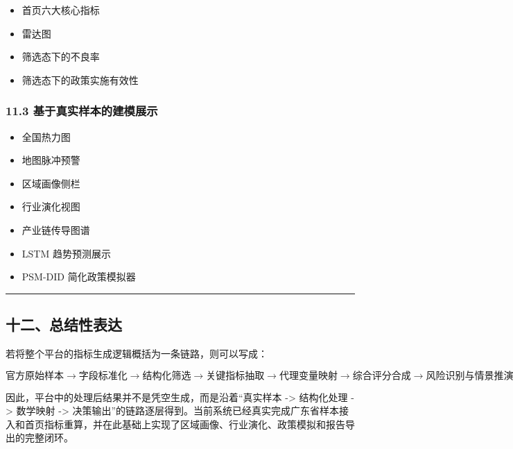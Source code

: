\documentclass[
]{article}
\providecommand{\tightlist}{%
  \setlength{\itemsep}{0pt}\setlength{\parskip}{0pt}}
\begin{document}
\begin{itemize}
\tightlist
\item
  首页六大核心指标
\item
  雷达图
\item
  筛选态下的不良率
\item
  筛选态下的政策实施有效性
\end{itemize}

\subsubsection{11.3
基于真实样本的建模展示}\label{ux57faux4e8eux771fux5b9eux6837ux672cux7684ux5efaux6a21ux5c55ux793a}

\begin{itemize}
\tightlist
\item
  全国热力图
\item
  地图脉冲预警
\item
  区域画像侧栏
\item
  行业演化视图
\item
  产业链传导图谱
\item
  LSTM 趋势预测展示
\item
  PSM-DID 简化政策模拟器
\end{itemize}

\begin{center}\rule{0.5\linewidth}{0.5pt}\end{center}

\subsection{十二、总结性表达}\label{ux5341ux4e8cux603bux7ed3ux6027ux8868ux8fbe}

若将整个平台的指标生成逻辑概括为一条链路，则可以写成：

\[
\text{官方原始样本}
\rightarrow
\text{字段标准化}
\rightarrow
\text{结构化筛选}
\rightarrow
\text{关键指标抽取}
\rightarrow
\text{代理变量映射}
\rightarrow
\text{综合评分合成}
\rightarrow
\text{风险识别与情景推演}
\]

因此，平台中的处理后结果并不是凭空生成，而是沿着``真实样本
-\textgreater{} 结构化处理 -\textgreater{} 数学映射 -\textgreater{}
决策输出''的链路逐层得到。当前系统已经真实完成广东省样本接入和首页指标重算，并在此基础上实现了区域画像、行业演化、政策模拟和报告导出的完整闭环。
\end{document}
